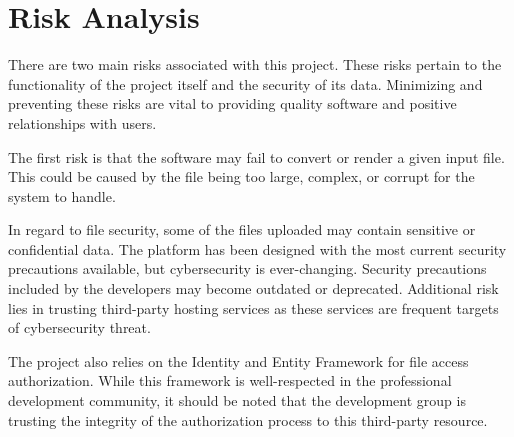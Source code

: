 
\section{Risk Analysis}
There are two main risks associated with this project. These risks pertain to the functionality of the project itself and the security of its data. Minimizing and preventing these risks are vital to providing quality software and positive relationships with users.

The first risk is that the software may fail to convert or render a given input file. This could be caused by the file being too large, complex, or corrupt for the system to handle. 

In regard to file security, some of the files uploaded may contain sensitive or confidential data. The platform has been designed with the most current security precautions available, but cybersecurity is ever-changing. Security precautions included by the developers may become outdated or deprecated. Additional risk lies in trusting third-party hosting services as these services are frequent targets of cybersecurity threat. 

The project also relies on the Identity and Entity Framework for file access authorization. While this framework is well-respected in the professional development community, it should be noted that the development group is trusting the integrity of the authorization process to this third-party resource.
